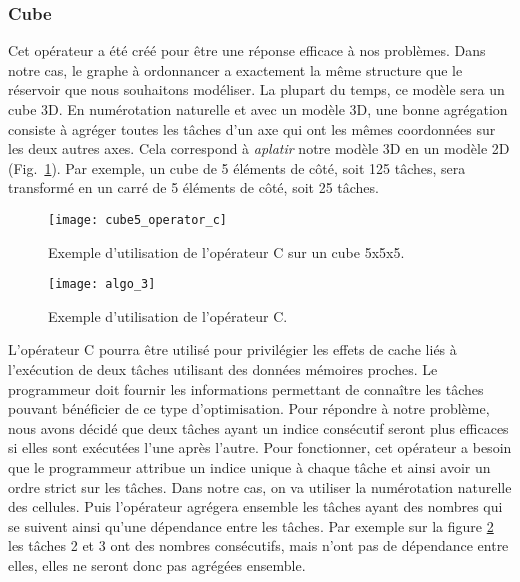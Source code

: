\subsubsection{Cube}
Cet opérateur a été créé pour être une réponse efficace à nos problèmes.
%
Dans notre cas, le graphe à ordonnancer a exactement la même structure que le réservoir que nous souhaitons modéliser.
%
La plupart du temps, ce modèle sera un cube 3D.
%
En numérotation naturelle et avec un modèle 3D, une bonne agrégation consiste à agréger toutes les tâches d'un axe qui ont les mêmes coordonnées sur les deux autres axes.
%
Cela correspond à {\em aplatir} notre modèle 3D en un modèle 2D (Fig.~\ref{fig:cube5_algo_C}).
%
Par exemple, un cube de 5 éléments de côté, soit 125 tâches, sera transformé en un carré de 5 éléments de côté, soit 25 tâches.

\begin{figure}
  \centering
  \texttt{[image: cube5\_operator\_c]}
  \caption{Exemple d'utilisation de l'opérateur C sur un cube 5x5x5.}
  \label{fig:cube5_algo_C}
\end{figure}

\begin{figure}
  \centering
  \texttt{[image: algo\_3]}
  \caption{Exemple d'utilisation de l'opérateur C.}
  \label{fig:algo_C}
\end{figure}

L'opérateur C pourra être utilisé pour privilégier les effets de cache liés à l'exécution de deux tâches utilisant des données mémoires proches.
%
Le programmeur doit fournir les informations permettant de connaître les tâches pouvant bénéficier de ce type d'optimisation.
%
Pour répondre à notre problème, nous avons décidé que deux tâches ayant un indice consécutif seront plus efficaces si elles sont exécutées l'une après l'autre.
%
Pour fonctionner, cet opérateur a besoin que le programmeur attribue un indice unique à chaque tâche et ainsi avoir un ordre strict sur les tâches.
%
Dans notre cas, on va utiliser la numérotation naturelle des cellules.
%
Puis l'opérateur agrégera ensemble les tâches ayant des nombres qui se suivent ainsi qu'une dépendance entre les tâches.
%
Par exemple sur la figure \ref{fig:algo_C} les tâches 2 et 3 ont des nombres consécutifs, mais n'ont pas de dépendance entre elles, elles ne seront donc pas agrégées ensemble.

